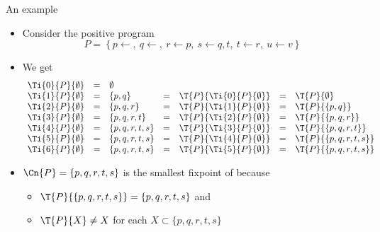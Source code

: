 \begin{frame}{An example}
  \begin{itemize}
  \item Consider the positive program
    \[
    P
    =
    \left\{
      p \leftarrow ,           \
      q \leftarrow ,           \
      r \leftarrow p,          \
      s \leftarrow q, t,       \
      t \leftarrow r,          \
      u \leftarrow v
    \right\}
    \]
  \item<2-> We get
    \[
    \begin{array}{lclclcl}
      \Ti{0}{P}{\emptyset}&=&\emptyset    &&&&\\
      \Ti{1}{P}{\emptyset}&=&\{p,q\}      &=&\T{P}{\Ti{0}{P}{\emptyset}}&=&\T{P}{\emptyset}\\
      \Ti{2}{P}{\emptyset}&=&\{p,q,r\}    &=&\T{P}{\Ti{1}{P}{\emptyset}}&=&\T{P}{\{p,q\}}\\
      \Ti{3}{P}{\emptyset}&=&\{p,q,r,t\}  &=&\T{P}{\Ti{2}{P}{\emptyset}}&=&\T{P}{\{p,q,r\}}\\
      \Ti{4}{P}{\emptyset}&=&\{p,q,r,t,s\}&=&\T{P}{\Ti{3}{P}{\emptyset}}&=&\T{P}{\{p,q,r,t\}}\\
      \Ti{5}{P}{\emptyset}&=&\{p,q,r,t,s\}&=&\T{P}{\Ti{4}{P}{\emptyset}}&=&\T{P}{\{p,q,r,t,s\}}\\
      \Ti{6}{P}{\emptyset}&=&\{p,q,r,t,s\}&=&\T{P}{\Ti{5}{P}{\emptyset}}&=&\T{P}{\{p,q,r,t,s\}}
    \end{array}
    \]
  \item<3-> $\Cn{P}=\{p,q,r,t,s\}$ is the smallest fixpoint of \Top{P}
    because
    \begin{itemize}\normalsize
    \item $\T{P}{\{p,q,r,t,s\}}=\{p,q,r,t,s\}$ and
    \item $\T{P}{X}\neq X$ for each $X\subset  \{p,q,r,t,s\}$
    \end{itemize}
  \end{itemize}
  \smallskip
\end{frame}
%
